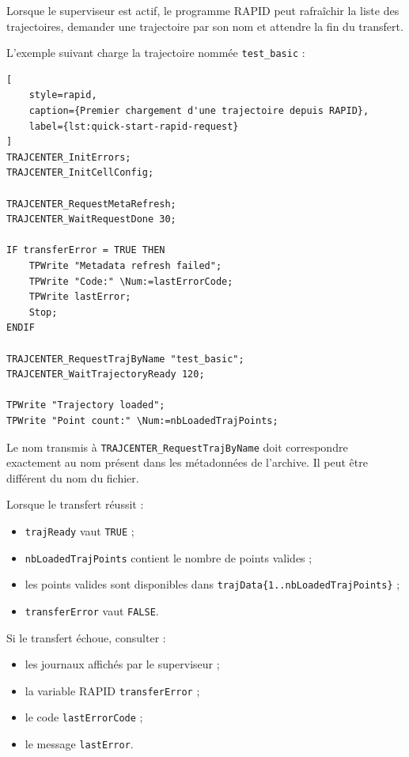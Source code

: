 \documentclass{rapportENSAM}
\begin{document}
Lorsque le superviseur est actif, le programme RAPID peut rafraîchir la liste des trajectoires, demander une trajectoire par son nom et attendre la fin du transfert.

L'exemple suivant charge la trajectoire nommée
\texttt{test\_basic} :

\begin{lstlisting}[
    style=rapid,
    caption={Premier chargement d'une trajectoire depuis RAPID},
    label={lst:quick-start-rapid-request}
]
TRAJCENTER_InitErrors;
TRAJCENTER_InitCellConfig;

TRAJCENTER_RequestMetaRefresh;
TRAJCENTER_WaitRequestDone 30;

IF transferError = TRUE THEN
    TPWrite "Metadata refresh failed";
    TPWrite "Code:" \Num:=lastErrorCode;
    TPWrite lastError;
    Stop;
ENDIF

TRAJCENTER_RequestTrajByName "test_basic";
TRAJCENTER_WaitTrajectoryReady 120;

TPWrite "Trajectory loaded";
TPWrite "Point count:" \Num:=nbLoadedTrajPoints;
\end{lstlisting}

Le nom transmis à \texttt{TRAJCENTER\_RequestTrajByName} doit correspondre exactement au nom présent dans les métadonnées de l'archive. Il peut être différent du nom du fichier.

Lorsque le transfert réussit :

\begin{itemize}
    \item \texttt{trajReady} vaut \texttt{TRUE} ;
    \item \texttt{nbLoadedTrajPoints} contient le nombre de points valides ;
    \item les points valides sont disponibles dans
    \texttt{trajData\{1..nbLoadedTrajPoints\}} ;
    \item \texttt{transferError} vaut \texttt{FALSE}.
\end{itemize}

Si le transfert échoue, consulter :

\begin{itemize}
    \item les journaux affichés par le superviseur ;
    \item la variable RAPID \texttt{transferError} ;
    \item le code \texttt{lastErrorCode} ;
    \item le message \texttt{lastError}.
\end{itemize}
\end{document}
